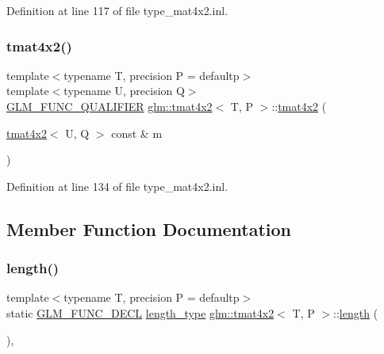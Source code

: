 Definition at line 117 of file type\+\_\+mat4x2.\+inl.

\mbox{\label{structglm_1_1tmat4x2_a08e86729278cf333bbde38195810311b}} 
\subsubsection{\texorpdfstring{tmat4x2()}{tmat4x2()}\hspace{0.1cm}{\footnotesize\ttfamily [22/22]}}
{\footnotesize\ttfamily template$<$typename T, precision P = defaultp$>$ \\
template$<$typename U, precision Q$>$ \\
\mbox{\hyperlink{setup_8hpp_a33fdea6f91c5f834105f7415e2a64407}{G\+L\+M\+\_\+\+F\+U\+N\+C\+\_\+\+Q\+U\+A\+L\+I\+F\+I\+ER}} \mbox{\hyperlink{structglm_1_1tmat4x2}{glm\+::tmat4x2}}$<$ T, P $>$\+::\mbox{\hyperlink{structglm_1_1tmat4x2}{tmat4x2}} (\begin{DoxyParamCaption}\item[{\mbox{\hyperlink{structglm_1_1tmat4x2}{tmat4x2}}$<$ U, Q $>$ const \&}]{m }\end{DoxyParamCaption})}



Definition at line 134 of file type\+\_\+mat4x2.\+inl.



\subsection{Member Function Documentation}
\mbox{\label{structglm_1_1tmat4x2_ac92a6ef242b14bc41a187b58984e4968}} 
\subsubsection{\texorpdfstring{length()}{length()}}
{\footnotesize\ttfamily template$<$typename T, precision P = defaultp$>$ \\
static \mbox{\hyperlink{setup_8hpp_ab2d052de21a70539923e9bcbf6e83a51}{G\+L\+M\+\_\+\+F\+U\+N\+C\+\_\+\+D\+E\+CL}} \mbox{\hyperlink{structglm_1_1tmat4x2_a28aaf36ee36edef6715c1fae6874f530}{length\+\_\+type}} \mbox{\hyperlink{structglm_1_1tmat4x2}{glm\+::tmat4x2}}$<$ T, P $>$\+::\mbox{\hyperlink{glad_8h_a1499969c13207ed8ab6f796685d4933f}{length}} (\begin{DoxyParamCaption}{ }\end{DoxyParamCaption})\hspace{0.3cm}{\ttfamily [inline]}, {\ttfamily [static]}}



